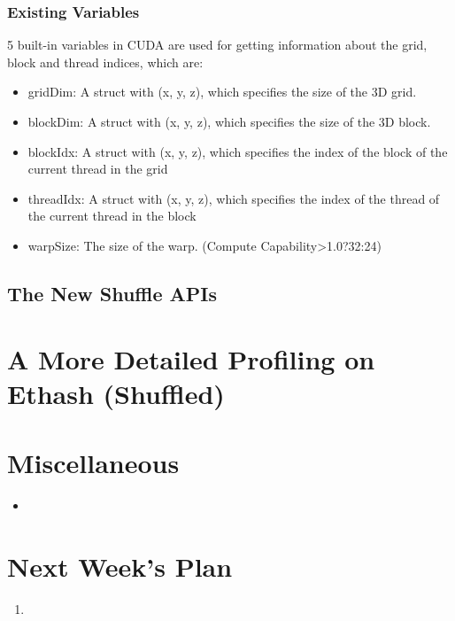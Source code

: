 \documentclass[11pt]{article}
\begin{document}
\subsubsection{Existing Variables}

5 built-in variables in CUDA are used for getting information about the grid, block and thread indices, which are:

\begin{itemize}
\item gridDim: A struct with (x, y, z), which specifies the size of the 3D grid.
\item blockDim: A struct with (x, y, z), which specifies the size of the 3D block.
\item blockIdx: A struct with (x, y, z), which specifies the index of the block of the current thread in the grid
\item threadIdx: A struct with (x, y, z), which specifies the index of the thread of the current thread in the block
\item warpSize: The size of the warp. (Compute Capability>1.0?32:24)
\end{itemize}

\subsection{The New Shuffle APIs}

\section{A More Detailed Profiling on Ethash (Shuffled)}


\section{Miscellaneous}

\begin{itemize}
\item 
\end{itemize}
%
%
\section{Next Week's Plan}
\begin{enumerate}
\item 
\end{enumerate}


%
%
\end{document}

